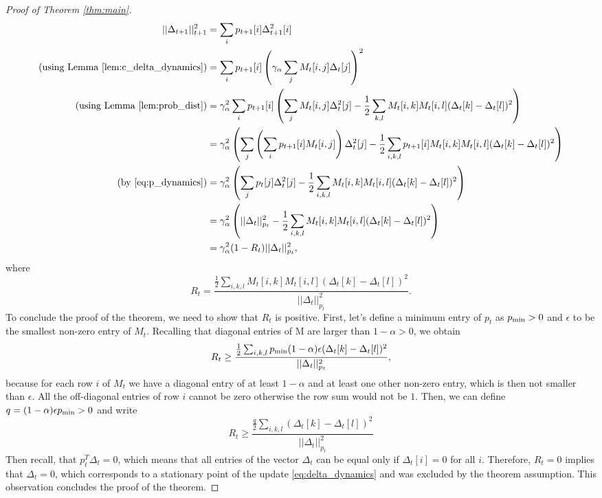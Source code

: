 \documentclass{article}
\begin{document}
\begin{proof}[Proof of Theorem \ref{thm:main}]
\begin{align*}
||\Delta_{t+1}||^2_{t+1} &= \sum_i p_{t+1}[i]\Delta_{t+1}^2[i]\\
\text{(using Lemma \ref{lem:c_delta_dynamics})} &= \sum_i p_{t+1}[i]\left(\gamma_\alpha \sum_j M_t[i,j]\Delta_t[j]\right)^2 \\
\text{(using Lemma \ref{lem:prob_dist})} &= \gamma_\alpha^2 \sum_i p_{t+1}[i] 
\left( \sum_j M_t[i,j] \Delta_t^2[j] - \frac{1}{2} \sum_{k,l} M_t[i,k]M_t[i,l] (\Delta_t[k] - \Delta_t[l])^2 \right) \\
&= \gamma_\alpha^2 \left(\sum_j \left( \sum_i p_{t+1}[i]M_t[i,j]\right)\Delta_t^2[j] - \frac{1}{2} \sum_{i,k,l} p_{t+1}[i] M_t[i,k]M_t[i,l] (\Delta_t[k] - \Delta_t[l])^2  \right) \\
\text{(by \ref{eq:p_dynamics})} &= \gamma_\alpha^2 \left( \sum_j p_t[j] \Delta_t^2[j]
- \frac{1}{2} \sum_{i,k,l} M_t[i,k]M_t[i,l] (\Delta_t[k] - \Delta_t[l])^2 \right) \\
&=\gamma_\alpha^2 \left(||\Delta_t||^2_{p_t} - \frac{1}{2} \sum_{i,k,l} M_t[i,k]M_t[i,l] (\Delta_t[k] - \Delta_t[l])^2   \right) \\
&=\gamma_\alpha^2 (1 - R_t) ||\Delta_t||^2_{p_t},
\end{align*}
where
\begin{equation} \label{eq:R_definition}
R_t = \frac{ \frac{1}{2} \sum_{i,k,l} M_t[i,k]M_t[i,l] (\Delta_t[k] - \Delta_t[l])^2}{||\Delta_t||^2_{p_t}}.
\end{equation}
To conclude the proof of the theorem, we need to show that $R_t$ is positive. First, let's define a minimum entry of $p_t$ as $p_{\rm min} > 0$ and $\epsilon$ to be the smallest non-zero entry of $M_t$. Recalling that diagonal entries of M are larger than $1-\alpha > 0$, we obtain
\begin{equation*}
R_t \ge \frac{\frac{1}{2} \sum_{i,k,l} p_{\rm min}(1-\alpha)\epsilon (\Delta_t[k] - \Delta_t[l])^2}{||\Delta_t||^2_{p_t}},
\end{equation*}
because for each row $i$ of $M_t$ we have a diagonal entry of at least $1-\alpha$ and at least one other non-zero entry, which is then not smaller than $\epsilon$. All the off-diagonal entries of row $i$ cannot be zero otherwise the row sum would not be $1$. Then, we can define $q=(1-\alpha) 
\epsilon p_{\rm min} > 0$ and write
\begin{equation*}
R_t \ge \frac{\frac{q}{2}\sum_{i,k,l} (\Delta_t[k] - \Delta_t[l])^2}{||\Delta_t||^2_{p_t}}
\end{equation*}
Then recall, that $p_t^T\Delta_t=0$, which means that all entries of the vector $\Delta_t$ can be equal only if $\Delta_t[i] = 0$ for all $i$. Therefore, $R_t=0$ implies that $\Delta_t=0$, which corresponds to a stationary point of the update \ref{eq:delta_dynamics} and was excluded by the theorem assumption. This observation concludes the proof of the theorem.
\end{proof}
\end{document}
